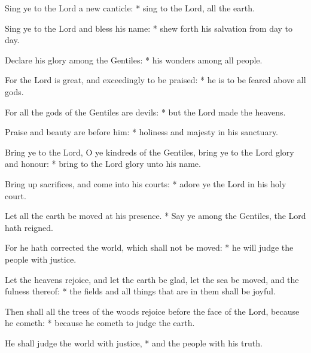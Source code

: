 ﻿\item Sing ye to the Lord a new canticle: * sing to the Lord, all the earth.
\item Sing ye to the Lord and bless his name: * shew forth his salvation from day to day.
\item Declare his glory among the Gentiles: * his wonders among all people.
\item For the Lord is great, and exceedingly to be praised: * he is to be feared above all gods.
\item For all the gods of the Gentiles are devils: * but the Lord made the heavens.
\item Praise and beauty are before him: * holiness and majesty in his sanctuary.
\item Bring ye to the Lord, O ye kindreds of the Gentiles, bring ye to the Lord glory and honour: * bring to the Lord glory unto his name.
\item Bring up sacrifices, and come into his courts: * adore ye the Lord in his holy court.
\item Let all the earth be moved at his presence. * Say ye among the Gentiles, the Lord hath reigned.
\item For he hath corrected the world, which shall not be moved: * he will judge the people with justice.
\item Let the heavens rejoice, and let the earth be glad, let the sea be moved, and the fulness thereof: * the fields and all things that are in them shall be joyful.
\item Then shall all the trees of the woods rejoice before the face of the Lord, because he cometh: * because he cometh to judge the earth.
\item He shall judge the world with justice, * and the people with his truth.